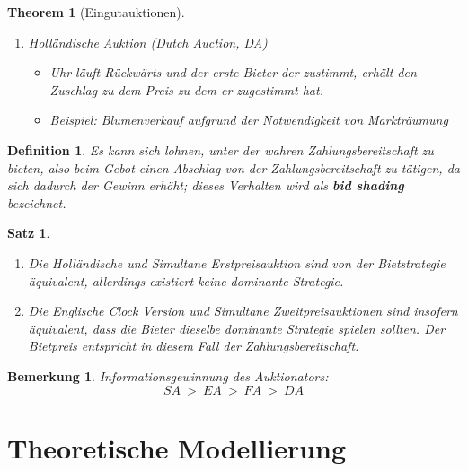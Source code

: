 \documentclass[12pt]{extreport} %
\theoremstyle{named}
\newtheorem*{unnamedtheorem*}{Theorem}
\theoremstyle{itshape}
\newtheorem{satz}[unnamedtheorem]{Satz}
\newtheorem*{definition}{Definition}
\theoremstyle{normal}
\newtheorem*{bemerkung}{Bemerkung}
\begin{document}
\begin{unnamedtheorem*}[Eingutauktionen]
\begin{enumerate}
\begin{itemize}
			\end{itemize}
		\item Holländische Auktion (Dutch Auction, DA)   
			\begin{itemize}
				\item Uhr läuft Rückwärts und der erste Bieter der zustimmt, erhält den Zuschlag zu dem Preis zu dem er zugestimmt hat.
				\item Beispiel: Blumenverkauf aufgrund der Notwendigkeit von Markträumung
			\end{itemize}
	\end{enumerate}
\end{unnamedtheorem*}

\begin{definition}
	Es kann sich lohnen, unter der wahren Zahlungsbereitschaft zu bieten, also beim Gebot einen Abschlag von der Zahlungsbereitschaft zu tätigen, da sich dadurch der Gewinn erhöht; dieses Verhalten wird als \textbf{bid shading} bezeichnet.
\end{definition}

\begin{satz} ~\
	\begin{enumerate}
		\item Die Holländische und Simultane Erstpreisauktion sind von der Bietstrategie äquivalent, allerdings existiert keine dominante Strategie.
		\item Die Englische Clock Version und Simultane Zweitpreisauktionen sind insofern äquivalent, dass die Bieter dieselbe dominante Strategie spielen sollten. Der Bietpreis entspricht in diesem Fall der Zahlungsbereitschaft.
	\end{enumerate}
\end{satz}

\begin{bemerkung}
	Informationsgewinnung des Auktionators:	
	$$ SA ~ > ~ EA ~ > ~ FA ~ > ~ DA  $$
\end{bemerkung}


\chapter{Theoretische Modellierung}
\end{document}
